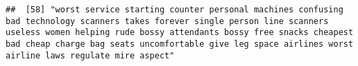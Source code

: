 \documentclass[
]{article}
\begin{document}
\begin{verbatim}
##  [58] "worst service starting counter personal machines confusing bad technology scanners takes forever single person line scanners useless women helping rude bossy attendants bossy free snacks cheapest bad cheap charge bag seats uncomfortable give leg space airlines worst airline laws regulate mire aspect"                                                                                                                                                                                                                                                                                                                                                                                                                                                                                                                                                                                                                                                                                                                                                                                                                                                                                                                                                                                                                                                                                                                                                                                                                                                                                                                                                                                                                                                                                  

\end{verbatim}
\end{document}
